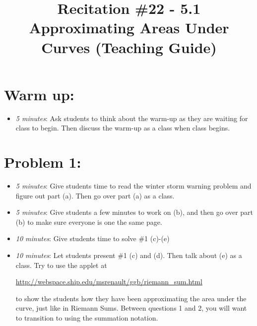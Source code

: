 \documentclass[handout,nooutcomes]{ximera}
\title{Recitation \#22 - 5.1 Approximating Areas Under Curves (Teaching Guide)}
\begin{document}
\begin{abstract}		\end{abstract}
\maketitle


\section{Warm up:} 
	
	\begin{itemize}
	
	\item  \emph{5 minutes}:  Ask students to think about the warm-up as they are waiting for class to begin.  Then discuss the warm-up as a class when class begins.
	
	
	
	\end{itemize}


\section{Problem 1:}

	\begin{itemize}
	
	\item  \emph{5 minutes}:  Give students time to read the winter storm warning problem and figure out part (a).  Then go over part (a) as a class.
	
	\item  \emph{5 minutes}:  Give students a few minutes to work on (b), and then go over part (b) to make sure everyone is one the same page.
	
	\item  \emph{10 minutes}:  Give students time to solve \#1 (c)-(e)
	
	\item  \emph{10 minutes}:  Let students present \#1 (c) and (d).  Then talk about (e) as a class.  Try to use the applet at
	
	 \url{http://webspace.ship.edu/msrenault/ggb/riemann_sum.html}
	  
	  to show the students how they have been approximating the area under the curve, just like in Riemann Sums.  Between questions 1 and 2, you will want to transition to using the summation notation.
	
	\end{itemize}
\end{document}
